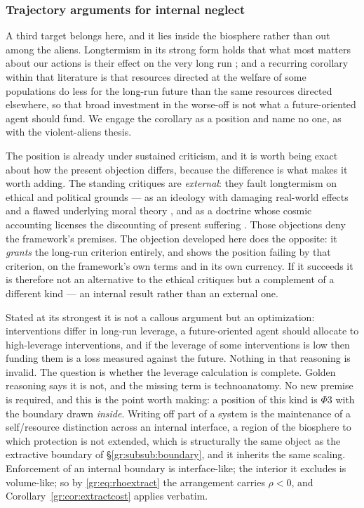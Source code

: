 \documentclass[11pt]{article}
\numberwithin{equation}{section}
\theoremstyle{plain}
\theoremstyle{definition}
\theoremstyle{remark}
\begin{document}
\subsubsection{Trajectory arguments for internal neglect}
\label{gr:subsub:neglect}

A third target belongs here, and it lies inside the biosphere rather
than out among the aliens. Longtermism in its strong form holds that
what most matters about our actions is their effect on the very long
run \cite{GM21}; and a recurring corollary within that literature is
that resources directed at the welfare of some populations do less for
the long-run future than the same resources directed elsewhere, so that
broad investment in the worse-off is not what a future-oriented agent
should fund. We engage the corollary as a position and name no one, as
with the violent-aliens thesis.

The position is already under sustained criticism, and it is worth being
exact about how the present objection differs, because the difference is
what makes it worth adding. The standing critiques are \emph{external}:
they fault longtermism on ethical and political grounds --- as an
ideology with damaging real-world effects and a flawed underlying moral
theory \cite{Crary23}, and as a doctrine whose cosmic accounting
licenses the discounting of present suffering \cite{Torres21}. Those
objections deny the framework's premises. The objection developed here
does the opposite: it \emph{grants} the long-run criterion entirely, and
shows the position failing by that criterion, on the framework's own
terms and in its own currency. If it succeeds it is therefore not an
alternative to the ethical critiques but a complement of a different
kind --- an internal result rather than an external one.

Stated at its strongest it is not a callous argument but an
optimization: interventions differ in long-run leverage, a
future-oriented agent should allocate to high-leverage interventions,
and if the leverage of some interventions is low then funding them is a
loss measured against the future. Nothing in that reasoning is invalid.
The question is whether the leverage calculation is complete. Golden reasoning says it is not, and the missing term is technoanatomy.
No new premise is required, and this is the point worth making: a
position of this kind is $\Phi3$ with the boundary drawn \emph{inside}.
Writing off part of a system is the maintenance of a self/resource
distinction across an internal interface, a region of the biosphere
to which protection is not extended, which is structurally the same
object as the extractive boundary of \S\ref{gr:subsub:boundary}, and it
inherits the same scaling. Enforcement of an internal boundary is
interface-like; the interior it excludes is volume-like; so by
\eqref{gr:eq:rhoextract} the arrangement carries $\rho<0$, and
Corollary~\ref{gr:cor:extractcost} applies verbatim.
\end{document}
